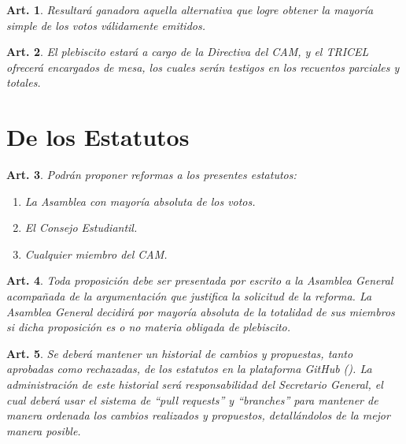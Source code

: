 \documentclass[letterpaper,11pt]{article}
\theoremstyle{plain}
\newtheorem{art}{Art.} %
\begin{document}
\begin{art}\label{}
	Resultará ganadora aquella alternativa que logre obtener la mayoría simple de los votos válidamente emitidos. %
\end{art}

\begin{art}\label{}
	El plebiscito estará a cargo de la Directiva del CAM, y el TRICEL ofrecerá encargados de mesa, los cuales serán testigos en los recuentos parciales y totales. %
\end{art}


\section{De los Estatutos}\label{estatutos}%

\begin{art}\label{}
	Podrán proponer reformas a los presentes estatutos:
	\begin{enumerate}
		\item La Asamblea con mayoría absoluta de los votos.
		\item El Consejo Estudiantil.
		\item Cualquier miembro del CAM.
	\end{enumerate}
\end{art}

\begin{art}\label{}
	Toda proposición debe ser presentada por escrito a la Asamblea General acompañada de la argumentación que justifica la solicitud de la reforma. La Asamblea General decidirá por mayoría absoluta de la totalidad de sus miembros si dicha proposición es o no materia obligada de plebiscito.
\end{art}

\begin{art}\label{}
	Se deberá mantener un historial de cambios y propuestas, tanto aprobadas como rechazadas, de los estatutos en la plataforma GitHub (). La administración de este historial será responsabilidad del Secretario General, el cual deberá usar el sistema de “pull requests” y “branches” para mantener de manera ordenada los cambios realizados y propuestos, detallándolos de la mejor manera posible.
\end{art}
\end{document}
